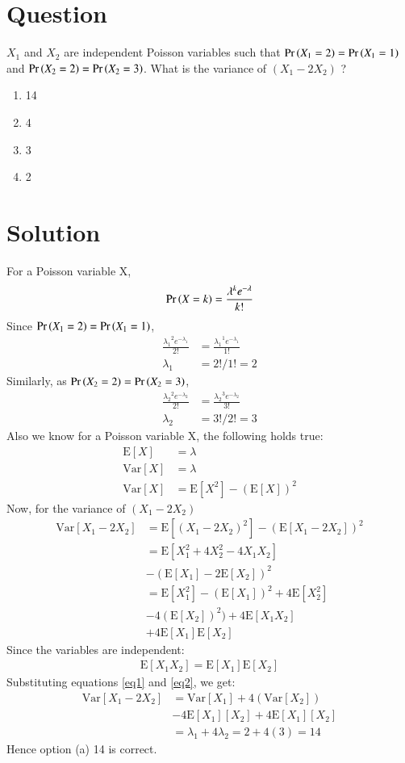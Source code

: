 \documentclass[journal,12pt,twocolumn]{IEEEtran}
\newcommand{\E}{\mathrm{E}}
\newcommand{\Var}{\mathrm{Var}}
\begin{document}
\section*{Question}
$X_1$ and $X_2$ are independent Poisson variables such that $\Pr\left(X_1=2\right) = \Pr\left(X_1=1\right)$ and $\Pr\left(X_2=2\right) = \Pr\left(X_2=3\right)$. What is the variance of $(X_1 - 2X_2)$ ?
\begin{enumerate}
    \item 14
    \item 4
    \item 3
    \item 2
\end{enumerate}
\section*{Solution}
For a Poisson variable X,
\begin{align}
\Pr\left(X=k\right) = \frac{\lambda^{k}e^{-\lambda}}{k!}
\end{align}
Since $\Pr\left(X_1=2\right) = \Pr\left(X_1=1\right)$,
\begin{align}
\frac{{\lambda_1}^{2}e^{-{\lambda_1}}}{2!} &= \frac{{\lambda_1}^{1}e^{-{\lambda_1}}}{1!} \\
\lambda_1 &= 2!/1! = 2
\end{align}
Similarly, as $\Pr\left(X_2=2\right) = \Pr\left(X_2=3\right)$,
\begin{align}
\frac{{\lambda_2}^{2}e^{-{\lambda_2}}}{2!} &= \frac{{\lambda_2}^{3}e^{-{\lambda_2}}}{3!} \\
\lambda_2 &= 3!/2! = 3
\end{align}
Also we know for a Poisson variable X, the following holds true:
\begin{align}
\E[X] &= \lambda \\
\Var[X] &= \lambda \label{eq1} \\
\Var[X] &= \E[X^2] - (\E[X])^2 \label{eq2} 
\end{align}
Now, for the variance of $(X_1 - 2X_2)$
\begin{align}
\Var[X_1 - 2X_2] &= \E[(X_1 - 2X_2)^2] - (\E[X_1 - 2X_2])^2 \nonumber \\
&= \E[X_1^2 + 4X_2^2 - 4X_1X_2] \nonumber \\
&- (\E[X_1] - 2\E[X_2])^2 \nonumber \\
&= \E[X_1^2] - (\E[X_1])^2 + 4\E[X_2^2] \nonumber \\
& -4(\E[X_2])^2) + 4\E[X_1X_2] \nonumber \\
& + 4\E[X_1]\E[X_2]
\end{align}
Since the variables are independent:
\begin{align}
\E[X_1X_2] = \E[X_1]\E[X_2]
\end{align}
Substituting equations \eqref{eq1} and \eqref{eq2}, we get:
\begin{align}
\Var[X_1 - 2X_2] &= \Var[X_1] + 4(\Var[X_2]) \nonumber \\
&- 4\E[X_1][X_2] + 4\E[X_1][X_2] \nonumber \\
&= \lambda_1 + 4\lambda_2 = 2 + 4(3) = 14
\end{align}
Hence option (a) 14 is correct.
\end{document}
